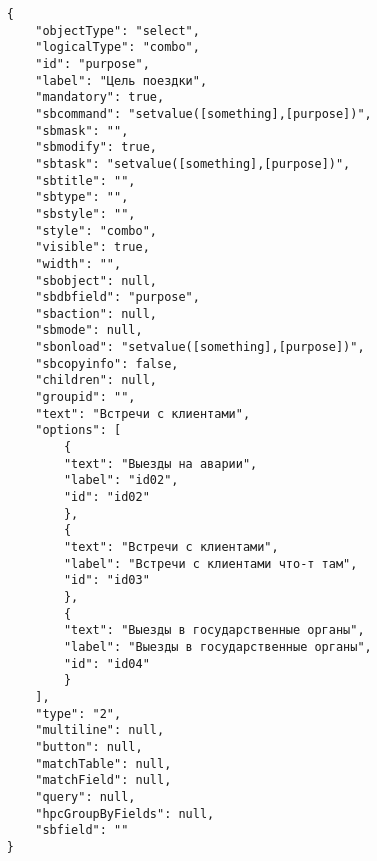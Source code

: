 \documentclass[../index.tex]{subfiles}
\begin{document}
\begin{verbatim}
    {
        "objectType": "select",
        "logicalType": "combo",
        "id": "purpose",
        "label": "Цель поездки",
        "mandatory": true,
        "sbcommand": "setvalue([something],[purpose])",
        "sbmask": "",
        "sbmodify": true,
        "sbtask": "setvalue([something],[purpose])",
        "sbtitle": "",
        "sbtype": "",
        "sbstyle": "",
        "style": "combo",
        "visible": true,
        "width": "",
        "sbobject": null,
        "sbdbfield": "purpose",
        "sbaction": null,
        "sbmode": null,
        "sbonload": "setvalue([something],[purpose])",
        "sbcopyinfo": false,
        "children": null,
        "groupid": "",
        "text": "Встречи с клиентами",
        "options": [
            {
            "text": "Выезды на аварии",
            "label": "id02",
            "id": "id02"
            },
            {
            "text": "Встречи с клиентами",
            "label": "Встречи с клиентами что-т там",
            "id": "id03"
            },
            {
            "text": "Выезды в государственные органы",
            "label": "Выезды в государственные органы",
            "id": "id04"
            }
        ],
        "type": "2",
        "multiline": null,
        "button": null,
        "matchTable": null,
        "matchField": null,
        "query": null,
        "hpcGroupByFields": null,
        "sbfield": ""
    }
\end{verbatim}
\end{document}

